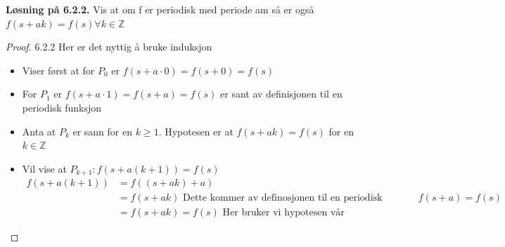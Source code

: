 \documentclass[a4paper,norsk]{article}
\renewcommand{\geq}{\geqslant}
\newenvironment{oppgave}[1]%
	{\trivlist{}\item\relax\textbf{Løsning på #1.}\medspace}%
	{\endtrivlist}
\begin{document}
\begin{oppgave}{6.2.2}
Vis at om f er periodisk med periode am så er også $ f(s + ak) = f(s) \forall k \in \mathbb{Z} $ 

\begin{proof}{6.2.2}
Her er det nyttig å bruke induksjon
\begin{itemize}
  \item Viser først at for $ P_0 $ er $ f(s + a \cdot 0) = f(s + 0) = f(s) $  
  \item For $ P_1 $ er $ f(s + a \cdot 1) = f(s+a) = f(s) $  er sant av definisjonen til en periodisk funksjon
  \item Anta at $ P_k $  er sann for en $ k \geq 1 $. Hypotesen er at $ f(s + ak) = f(s)  $ for en $ k \in \mathbb{Z} $ 
  \item Vil vise at $ P_{k+1}: f(s + a \left( k+1 \right) ) = f(s) $
  \begin{align*}
    f(s + a \left( k+1 \right)) &= f( \left( s + ak \right) + a) \\
    &=   f \left( s + ak \right) \text{ Dette kommer av definosjonen til en periodisk funksjon } f(s+a) = f(s) \\
    &= f \left( s + ak \right) = f(s) \text{ Her bruker vi hypotesen vår} 
  \end{align*}
  
\end{itemize}
\end{proof}
\end{oppgave}
 
\end{document}
